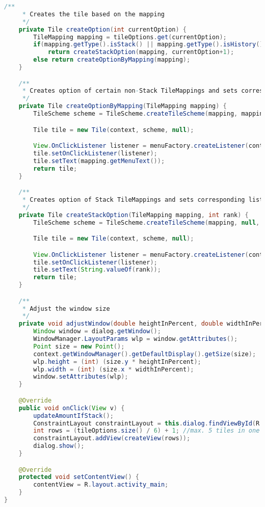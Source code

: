 \begin{lstlisting}[caption=InputTileMapping,label=list:InputTileMapping,language=Java]
    /**
     * Creates the tile based on the mapping
     */
    private Tile createOption(int currentOption) {
        TileMapping mapping = tileOptions.get(currentOption);
        if(mapping.getType().isStack() || mapping.getType().isHistory())
            return createStackOption(mapping, currentOption+1);
        else return createOptionByMapping(mapping);
    }

    /**
     * Creates option of certain non-Stack TileMappings and sets corresponding listener
     */
    private Tile createOptionByMapping(TileMapping mapping) {
        TileScheme scheme = TileScheme.createTileScheme(mapping, mapping.getMenuText());

        Tile tile = new Tile(context, scheme, null);

        View.OnClickListener listener = menuFactory.createListener(context, mapping);
        tile.setOnClickListener(listener);
        tile.setText(mapping.getMenuText());
        return tile;
    }

    /**
     * Creates option of Stack TileMappings and sets corresponding listener
     */
    private Tile createStackOption(TileMapping mapping, int rank) {
        TileScheme scheme = TileScheme.createTileScheme(mapping, null, rank);

        Tile tile = new Tile(context, scheme, null);

        View.OnClickListener listener = menuFactory.createListener(context, mapping, rank);
        tile.setOnClickListener(listener);
        tile.setText(String.valueOf(rank));
        return tile;
    }

    /**
     * Adjust the window size
     */
    private void adjustWindow(double heightInPercent, double widthInPercent) {
        Window window = dialog.getWindow();
        WindowManager.LayoutParams wlp = window.getAttributes();
        Point size = new Point();
        context.getWindowManager().getDefaultDisplay().getSize(size);
        wlp.height = (int) (size.y * heightInPercent);
        wlp.width = (int) (size.x * widthInPercent);
        window.setAttributes(wlp);
    }

    @Override
    public void onClick(View v) {
        updateAmountIfStack();
        ConstraintLayout constraintLayout = this.dialog.findViewById(R.id.constraintLayout);
        int rows = (tileOptions.size() / 6) + 1; //max. 5 tiles in one row
        constraintLayout.addView(createView(rows));
        dialog.show();
    }

    @Override
    protected void setContentView() {
        contentView = R.layout.activity_main;
    }
}
\end{lstlisting}    

